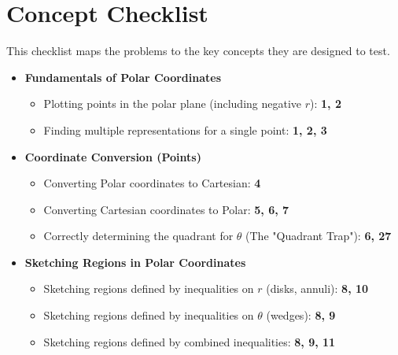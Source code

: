 \documentclass{article}
\begin{document}
\newpage
\section{Concept Checklist}

This checklist maps the problems to the key concepts they are designed to test.

\begin{itemize}
    \item \textbf{Fundamentals of Polar Coordinates}
    \begin{itemize}
        \item Plotting points in the polar plane (including negative $r$): \textbf{1, 2}
        \item Finding multiple representations for a single point: \textbf{1, 2, 3}
    \end{itemize}

    \item \textbf{Coordinate Conversion (Points)}
    \begin{itemize}
        \item Converting Polar coordinates to Cartesian: \textbf{4}
        \item Converting Cartesian coordinates to Polar: \textbf{5, 6, 7}
        \item Correctly determining the quadrant for $\theta$ (The "Quadrant Trap"): \textbf{6, 27}
    \end{itemize}

    \item \textbf{Sketching Regions in Polar Coordinates}
    \begin{itemize}
        \item Sketching regions defined by inequalities on $r$ (disks, annuli): \textbf{8, 10}
        \item Sketching regions defined by inequalities on $\theta$ (wedges): \textbf{8, 9}
        \item Sketching regions defined by combined inequalities: \textbf{8, 9, 11}
    \end{itemize}


\end{itemize}
\end{document}

